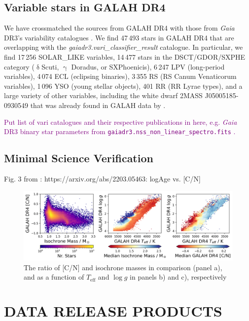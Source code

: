 \documentclass[
  journal=pasa,
  manuscript=research-paper, %
  year=2024,
  volume=37
]{cup-journal}
\newcommand{\SB}[1]{{\textcolor{purple}{#1}}}
\newcommand{\Teff}{$T_\mathrm{eff}$\xspace}
\newcommand{\logg}{$\log g$\xspace}
\newcommand{\Gaia}{\textit{Gaia}\xspace}
\begin{document}
\subsection{Variable stars in GALAH DR4}

We have crossmatched the sources from GALAH DR4 with those from \Gaia DR3's variability catalogues \citep{Rimoldini2023}. We find 47\,493 stars in GALAH DR4 that are overlapping with the \textit{gaiadr3.vari\_classifier\_result} catalogue. In particular, we find 17\,256 SOLAR\_LIKE variables, 14\,477 stars in the DSCT/GDOR/SXPHE category ({$\updelta$}Scuti, {$\upgamma$} Doradus, or SXPhoenicis), 6\,247 LPV (long-period variables), 4\,074 ECL (eclipsing binaries), 3\,355 RS (RS Canum Venaticorum variables), 1\,096 YSO (young stellar objects), 401 RR (RR Lyrae types), and a large variety of other variables, including the white dwarf 2MASS J05005185-0930549 that was already found in GALAH data by \citet{Kawka2020}.

\SB{Put list of vari catalogues and their respective publications in here, e.g. \Gaia DR3 binary star parameters from \texttt{gaiadr3.nss\_non\_linear\_spectro.fits} \citep{Halbwachs2023}.
}



\subsection{Minimal Science Verification}

Fig. 3 from \citet{Spoo2022}: https://arxiv.org/abs/2203.05463: logAge vs. [C/N]

\begin{figure}
    \centering
    \includegraphics[width=\columnwidth]{figures/cn_mass.png}
    \caption{The ratio of [C/N] and isochrone masses in comparison (panel a), and as a function of \Teff and \logg in panels b) and c), respectively}
    \label{fig:cn_mass}
\end{figure}

\section{DATA RELEASE PRODUCTS}
\label{sec:catalogues_release_products}
\end{document}
